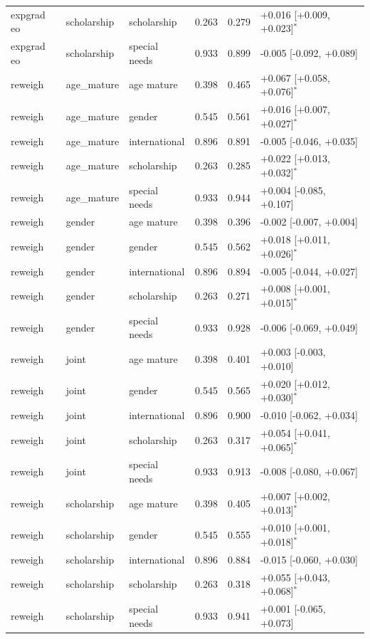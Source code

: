 \begin{table}[t]
\begin{tabular}{lllrrl}
expgrad eo & scholarship & scholarship & 0.263 & 0.279 & +0.016 [+0.009, +0.023]$^{*}$ \\
expgrad eo & scholarship & special needs & 0.933 & 0.899 & -0.005 [-0.092, +0.089] \\
reweigh & age_mature & age mature & 0.398 & 0.465 & +0.067 [+0.058, +0.076]$^{*}$ \\
reweigh & age_mature & gender & 0.545 & 0.561 & +0.016 [+0.007, +0.027]$^{*}$ \\
reweigh & age_mature & international & 0.896 & 0.891 & -0.005 [-0.046, +0.035] \\
reweigh & age_mature & scholarship & 0.263 & 0.285 & +0.022 [+0.013, +0.032]$^{*}$ \\
reweigh & age_mature & special needs & 0.933 & 0.944 & +0.004 [-0.085, +0.107] \\
reweigh & gender & age mature & 0.398 & 0.396 & -0.002 [-0.007, +0.004] \\
reweigh & gender & gender & 0.545 & 0.562 & +0.018 [+0.011, +0.026]$^{*}$ \\
reweigh & gender & international & 0.896 & 0.894 & -0.005 [-0.044, +0.027] \\
reweigh & gender & scholarship & 0.263 & 0.271 & +0.008 [+0.001, +0.015]$^{*}$ \\
reweigh & gender & special needs & 0.933 & 0.928 & -0.006 [-0.069, +0.049] \\
reweigh & joint & age mature & 0.398 & 0.401 & +0.003 [-0.003, +0.010] \\
reweigh & joint & gender & 0.545 & 0.565 & +0.020 [+0.012, +0.030]$^{*}$ \\
reweigh & joint & international & 0.896 & 0.900 & -0.010 [-0.062, +0.034] \\
reweigh & joint & scholarship & 0.263 & 0.317 & +0.054 [+0.041, +0.065]$^{*}$ \\
reweigh & joint & special needs & 0.933 & 0.913 & -0.008 [-0.080, +0.067] \\
reweigh & scholarship & age mature & 0.398 & 0.405 & +0.007 [+0.002, +0.013]$^{*}$ \\
reweigh & scholarship & gender & 0.545 & 0.555 & +0.010 [+0.001, +0.018]$^{*}$ \\
reweigh & scholarship & international & 0.896 & 0.884 & -0.015 [-0.060, +0.030] \\
reweigh & scholarship & scholarship & 0.263 & 0.318 & +0.055 [+0.043, +0.068]$^{*}$ \\
reweigh & scholarship & special needs & 0.933 & 0.941 & +0.001 [-0.065, +0.073] \\

\end{tabular}
\end{table}
